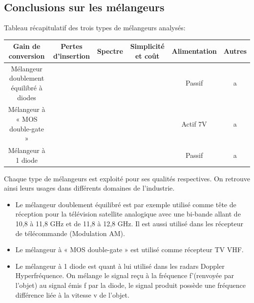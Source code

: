 \documentclass{article}
\begin{document}
\subsection{Conclusions sur les mélangeurs}


Tableau récapitulatif des trois types de mélangeurs analysés:

\begin{tabular}{|c|c|c|c|c|c|}
\hline Gain de conversion& Pertes d'insertion& Spectre& Simplicité et coût& Alimentation& Autres \\
\hline Mélangeur doublement équilibré à diodes & & & & Passif& a \\ 
\hline Mélangeur à « MOS double-gate » &  & & & Actif 7V& a  \\ 
\hline Mélangeur à 1 diode &  & & & Passif& a  \\ 
\hline 
\end{tabular} 



Chaque type de mélangeurs est exploité pour ses qualités respectives. On retrouve ainsi leurs usages dans différents domaines de l'industrie.
\begin{itemize}

\item Le mélangeur doublement équilibré est par exemple utilisé comme tête de réception pour la télévision satellite analogique avec une bi-bande allant de 10,8 à 11,8 GHz et de 11,8 à 12,8 GHz.
Il est aussi utilisé dans les récepteur de télécommande (Modulation AM).
\item Le mélangeur à « MOS double-gate » est utilisé comme récepteur TV VHF.
\item Le mélangeur à 1 diode est quant à lui utilisé dans les radars Doppler Hyperfréquence. On mélange le signal reçu à la fréquence f’(renvoyée par l'objet) au signal émis f par la diode, le signal produit possède une fréquence différence liée à la vitesse v de l'objet. 
\end{itemize}


%
%
%
%
\end{document}
